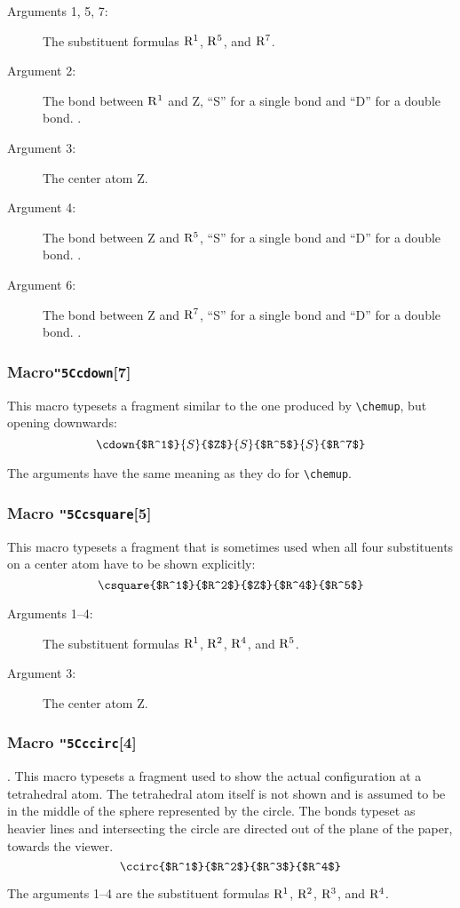  \begin{description}
 \item[{\rm Arguments 1, 5, 7:}] The substituent formulas
      ${\rm R^1}$, ${\rm R^5}$, and ${\rm R^7}$.
 \item[{\rm Argument 2:}] The bond between ${\rm R^1}$ and
      Z, ``S'' for a single bond and ``D'' for a double bond. \ri .
 \item[{\rm Argument 3:}] The center atom Z.
 \item[{\rm Argument 4:}] The bond between Z and ${\rm R^5}$,
      ``S'' for a single bond and ``D'' for a double bond. \ri .
 \item[{\rm Argument 6:}] The bond between Z and ${\rm R^7}$,
      ``S'' for a single bond and ``D'' for a double bond. \ri .
 \end{description}
 
\subsubsection{Macro{\tt\char"5C{}cdown}[7]}
   This macro typesets a fragment similar to the one produced
 by \verb+\chemup+, but opening downwards:
 \[ \cdown{$R^1$}{S}{$Z$}{S}{$R^5$}{S}{$R^7$}   \]
 
 The arguments have the same meaning as they do for \verb+\chemup+.
 
\subsubsection{Macro {\tt\char"5C{}csquare}[5]}
  This macro typesets a fragment that is sometimes used when all
 four substituents on a center atom have to be shown explicitly:
 \[ \csquare{$R^1$}{$R^2$}{$Z$}{$R^4$}{$R^5$}  \]
 
 \begin{description}
 \item[{\rm Arguments 1--4:}] The substituent formulas
      ${\rm R^1}$, ${\rm R^2}$, ${\rm R^4}$, and ${\rm R^5}$.
 \item[{\rm Argument 3:}] The center atom Z.
 \end{description}
 
\subsubsection{Macro {\tt\char"5C{}ccirc}[4]}.
  This macro typesets a fragment used to show the actual
 configuration at a tetrahedral atom. The tetrahedral atom itself
 is not shown and is assumed to be in the middle of the sphere
 represented by the circle. The bonds typeset as heavier lines
 and intersecting the circle are directed out of the plane of
 the paper, towards the viewer.
 \[ \ccirc{$R^1$}{$R^2$}{$R^3$}{$R^4$}   \]
 
 The arguments 1--4
 are the substituent formulas ${\rm R^1}$, ${\rm R^2}$,
 ${\rm R^3}$, and ${\rm R^4}$.
 
 
 
 
 
 
